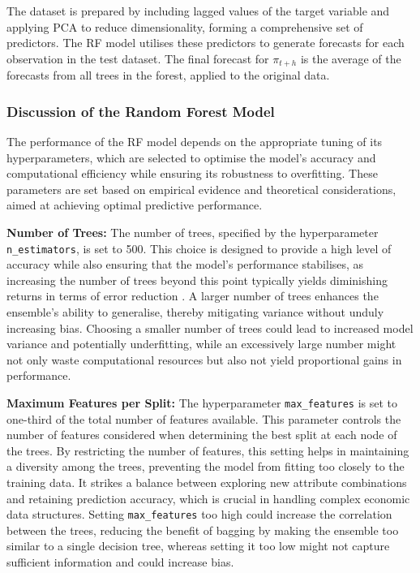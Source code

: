 The dataset is prepared by including lagged values of the target variable and applying PCA to reduce dimensionality, forming a comprehensive set of predictors. The RF model utilises these predictors to generate forecasts for each observation in the test dataset. The final forecast for $\pi_{t+h}$ is the average of the forecasts from all trees in the forest, applied to the original data. 

\subsubsection*{Discussion of the Random Forest Model}

The performance of the RF model depends on the appropriate tuning of its hyperparameters, which are selected to optimise the model's accuracy and computational efficiency while ensuring its robustness to overfitting. These parameters are set based on empirical evidence and theoretical considerations, aimed at achieving optimal predictive performance.

\noindent \textbf{Number of Trees:} The number of trees, specified by the hyperparameter \texttt{n\_estimators}, is set to 500. This choice is designed to provide a high level of accuracy while also ensuring that the model's performance stabilises, as increasing the number of trees beyond this point typically yields diminishing returns in terms of error reduction \autocite{Medeiros2021ForecastingMethods}. A larger number of trees enhances the ensemble's ability to generalise, thereby mitigating variance without unduly increasing bias. Choosing a smaller number of trees could lead to increased model variance and potentially underfitting, while an excessively large number might not only waste computational resources but also not yield proportional gains in performance.

\noindent \textbf{Maximum Features per Split:} The hyperparameter \texttt{max\_features} is set to one-third of the total number of features available. This parameter controls the number of features considered when determining the best split at each node of the trees. By restricting the number of features, this setting helps in maintaining a diversity among the trees, preventing the model from fitting too closely to the training data. It strikes a balance between exploring new attribute combinations and retaining prediction accuracy, which is crucial in handling complex economic data structures. Setting \texttt{max\_features} too high could increase the correlation between the trees, reducing the benefit of bagging by making the ensemble too similar to a single decision tree, whereas setting it too low might not capture sufficient information and could increase bias.

